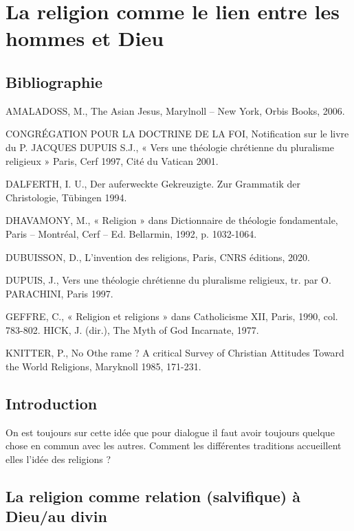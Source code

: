 \chapter{La religion comme le lien entre les hommes et Dieu }


\section{Bibliographie}
AMALADOSS, M., The Asian Jesus, Marylnoll – New York, Orbis Books, 2006. 

CONGRÉGATION POUR LA DOCTRINE DE LA FOI, Notification sur le livre du P. JACQUES DUPUIS S.J., « Vers une théologie chrétienne du pluralisme religieux » Paris, Cerf 1997, Cité du Vatican 2001. 


DALFERTH, I. U., Der auferweckte Gekreuzigte. Zur Grammatik der Christologie, Tübingen 1994. 

DHAVAMONY, M., « Religion » dans Dictionnaire de théologie fondamentale, Paris – Montréal, Cerf – Ed. Bellarmin, 1992, p. 1032-1064. 

DUBUISSON, D., L’invention des religions, Paris, CNRS éditions, 2020. 

DUPUIS, J., Vers une théologie chrétienne du pluralisme religieux, tr. par O. PARACHINI, Paris 1997.  

GEFFRE, C., « Religion et religions » dans Catholicisme XII, Paris, 1990, col. 783-802. HICK, J. (dir.), The Myth of God Incarnate, 1977. 

KNITTER, P., No Othe rame ? A critical Survey of Christian Attitudes Toward the World Religions, Maryknoll 1985, 171-231. 




\section{Introduction }


 
	On est toujours sur cette idée que pour dialogue il faut avoir toujours quelque chose en commun avec les autres. 
	Comment les différentes traditions accueillent elles l’idée des religions ?
\section{ La religion comme relation (salvifique) à Dieu/au divin }

